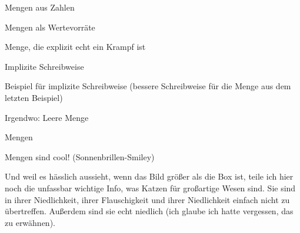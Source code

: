 \documentclass[../../main.tex]{subfiles}
\begin{document}
\begin{example}{}
    Mengen aus Zahlen
\end{example}

Mengen als Wertevorräte

\begin{example}{}
    Menge, die explizit echt ein Krampf ist
\end{example}

Implizite Schreibweise

\begin{example}{}
    Beispiel für implizite Schreibweise (bessere Schreibweise für die Menge aus dem letzten Beispiel)
\end{example}

Irgendwo: Leere Menge

\begin{nutshell}{Mengen}

    Mengen sind cool! (Sonnenbrillen-Smiley)

    Und weil es hässlich aussieht, wenn das Bild größer als die Box ist, teile ich hier noch die unfassbar wichtige Info, was Katzen für großartige Wesen sind. Sie sind in ihrer Niedlichkeit, ihrer Flauschigkeit und ihrer Niedlichkeit einfach nicht zu übertreffen. Außerdem sind sie echt niedlich (ich glaube ich hatte vergessen, das zu erwähnen). 
\end{nutshell}
\end{document}
